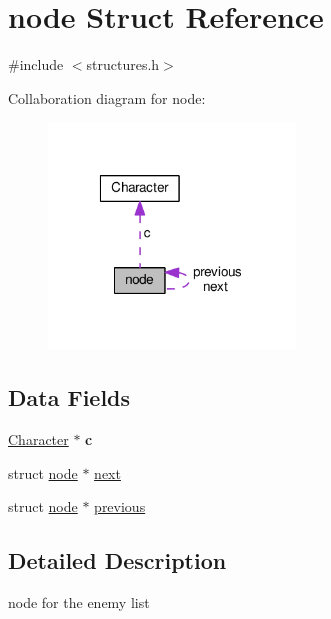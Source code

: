 \hypertarget{structnode}{\section{node Struct Reference}
\label{structnode}
}


{\ttfamily \#include $<$structures.\-h$>$}



Collaboration diagram for node\-:
\nopagebreak
\begin{figure}[H]
\begin{center}
\leavevmode
\includegraphics[width=186pt]{structnode__coll__graph}
\end{center}
\end{figure}
\subsection*{Data Fields}
\begin{DoxyCompactItemize}
\item 
\hypertarget{structnode_af76e20a507ad8fd205b860bab7ba4416}{\hyperlink{struct_character}{Character} $\ast$ {\bfseries c}}\label{structnode_af76e20a507ad8fd205b860bab7ba4416}

\item 
struct \hyperlink{structnode}{node} $\ast$ \hyperlink{structnode_a0dc1b6470487aa86d9936e3cab8b95be}{next}
\item 
struct \hyperlink{structnode}{node} $\ast$ \hyperlink{structnode_aba783da56f092df6846bd3b7b9555728}{previous}
\end{DoxyCompactItemize}


\subsection{Detailed Description}
node for the enemy list 

